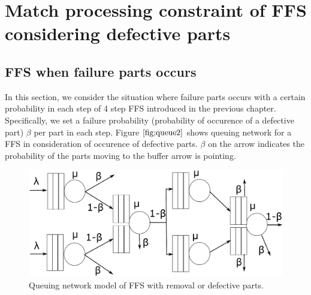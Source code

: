 %
%
%
%
%
%

\chapter{Match processing constraint of FFS considering defective parts}



\section{FFS when failure parts occurs \label{sec:furyo}}
In this section, we consider the situation where failure parts occurs with a certain probability in each step of 4 step FFS introduced in the previous chapter.
Specifically, we set a failure probability (probability of occurence of a defective part) $\beta$ per part in each step.
Figure $\ref{fig;queue2}$ shows queuing network for a FFS in consideration of occurence of defective parts.
$\beta$ on the arrow indicates the probability of the parts moving to the buffer arrow is pointing.

\begin{figure}[ht]
	\begin{center}
		\includegraphics[clip, width=\hsize]{fig/queue-2.eps}
	\end{center}
	\caption{Queuing network model of FFS with removal or defective parts.}
	\label{fig:queue2}
\end{figure}


